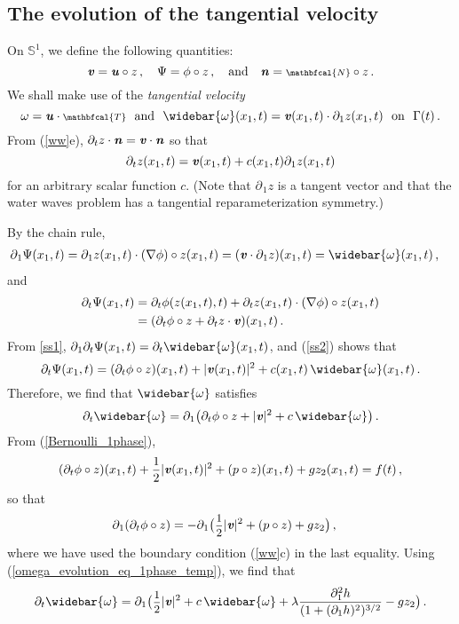 \documentclass[11pt]{article}
\theoremstyle{plain}
\theoremstyle{definition}
\theoremstyle{definition}
\def\bfn{{\mathbf n}}
\def\bfn{\text{\bf\emph{n}}}
\def\p{\text{\bf\emph{p}}}
\def\u{\text{\bf\emph{u}}}
\def\v{\text{\bf\emph{v}}}
\def\bp{{\partial_1}}
\def\p{{\partial\hspace{1pt}}}
\def\smallexp#1{{\text{\small #1}}}
\def\dfrac#1#2{\smallexp{$\displaystyle{}\frac{#1}{#2}$}}
\def\nn{{\scriptstyle \mathbfcal{N} }}
\def\tt{{\scriptstyle \mathbfcal{T} }}
\begin{document}
\subsection{The evolution of the tangential velocity}
On  $\mathbb{S}^1$,  we define the following
quantities:
$$
\v = \u \circ z\,,\quad \Psi = \phi \circ z\,,\quad\text{and}\quad \bfn = \nn \circ z\,.
$$
We shall make use of the {\it tangential velocity}
$$
\omega = \u \cdot \tt  \ \text{ and } \
\widebar{\omega}(x_1, t) = \v(x_1, t) \cdot \partial_1 z( x_1, t) \  \text{ on } \ \Gamma(t) \,.
$$
From (\ref{ww}e),  $\partial_t z \cdot \bfn = \v \cdot \bfn$ so that
\begin{equation}\label{ss2}
\partial_t z(x_1,t) = \v(x_1,t) + c(x_1,t) \p_{\!1} z(x_1,t)
\end{equation}
for an arbitrary scalar function $c$.   (Note that $\p_{\!1} z$ is a tangent vector and that the water waves problem has a tangential reparameterization symmetry.)

By the chain rule,
\begin{align}
\p_{\!1} \Psi(x_1,t) &= \p_{\!1} z(x_1,t) \cdot (\nabla \phi)\circ z(x_1,t)
 = (\v \cdot \p_{\!1} z)(x_1,t)
 = \widebar{\omega}(x_1,t)\,,\label{ss1}
\end{align}
and
\begin{align*}
\partial_t \Psi(x_1,t) &= \partial_t \phi(z(x_1,t),t) + \partial_t z(x_1,t) \cdot (\nabla \phi) \circ z(x_1,t)\\
&= (\partial_t \phi \circ z + \partial_t z \cdot \v)(x_1,t)\,.
\end{align*}
From \eqref{ss1}, $\p_{\!1} \partial_t \Psi(x_1,t) = \partial_t \widebar{\omega}(x_1,t)$, and (\ref{ss2}) shows that
$$
\partial_t \Psi(x_1,t) = (\partial_t \phi \circ z)(x_1,t) + |\v(x_1,t)|^2 + c(x_1,t) \,\widebar{\omega}(x_1,t)\,.
$$
Therefore, we find that $\widebar{\omega}$ satisfies
\begin{equation}\label{omega_evolution_eq_1phase_temp}
\partial_t \widebar{\omega} = \p_{\!1} \big(\partial_t \phi \circ z + |\v|^2 + c \,\widebar{\omega} \big)\,.
\end{equation}
From (\ref{Bernoulli_1phase}),
$$
(\partial_t \phi \circ z)(x_1,t) + \frac{1}{2} |\v(x_1,t)|^2 + (p\circ z)(x_1,t) + gz_2(x_1,t) = f(t) \,,
$$
so that
\begin{align*}
\p_{\!1} (\partial_t \phi \circ z)& = - \p_{\!1} \big(\dfrac{1}{2} |\v|^2 + (p\circ z)+ gz_2\big)
 \,,
\end{align*}
where we have used the boundary condition (\ref{ww}c) in the last equality.
Using  (\ref{omega_evolution_eq_1phase_temp}), we find that
\begin{equation}\label{omega_evolution_eq_1phase}
\partial_t \widebar{\omega} = \p_{\!1} \big(\dfrac{1}{2} |\v|^2 + c \,\widebar{\omega}  + \lambda \frac{\partial_1^2h}{(1+(\bp h)^2)^{3/2}}  - gz_2\big)  \,.
\end{equation}
\end{document}
